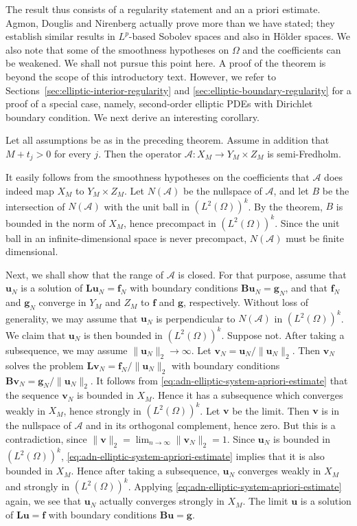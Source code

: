 The result thus consists of a regularity statement and an a priori estimate. Agmon, Douglis and Nirenberg actually prove more than we have stated; they establish similar results in $L^p$-based Sobolev spaces and also in Hölder spaces. We also note that some of the smoothness hypotheses on $\Omega$ and the coefficients can be weakened. We shall not pursue this point here. A proof of the theorem is beyond the scope of this introductory text. However, we refer to Sections~\ref{sec:elliptic-interior-regularity} and \ref{sec:elliptic-boundary-regularity} for a proof of a special case, namely, second-order elliptic PDEs with Dirichlet boundary condition. We next derive an interesting corollary.

\begin{Corollary}
\label{cor:adn-boundary-operator-semi-fredholm}
Let all assumptions be as in the preceding theorem. Assume in addition that $M+t_j>0$ for every $j$. Then the operator $\mathcal{A}:X_M\to Y_M\times Z_M$ is semi-Fredholm.
\end{Corollary}

\begin{Proof}
It easily follows from the smoothness hypotheses on the coefficients that $\mathcal{A}$ does indeed map $X_M$ to $Y_M\times Z_M$. Let $N(\mathcal{A})$ be the nullspace of $\mathcal{A}$, and let $B$ be the intersection of $N(\mathcal{A})$ with the unit ball in $(L^2(\Omega))^k$. By the theorem, $B$ is bounded in the norm of $X_M$, hence precompact in $(L^2(\Omega))^k$. Since the unit ball in an infinite-dimensional space is never precompact, $N(\mathcal{A})$ must be finite dimensional.

Next, we shall show that the range of $\mathcal{A}$ is closed. For that purpose, assume that $\bm{u}_N$ is a solution of $\bm{L}\bm{u}_N=\bm{f}_N$ with boundary conditions $\bm{B}\bm{u}_N=\bm{g}_N$, and that $\bm{f}_N$ and $\bm{g}_N$ converge in $Y_M$ and $Z_M$ to $\bm{f}$ and $\bm{g}$, respectively. Without loss of generality, we may assume that $\bm{u}_N$ is perpendicular to $N(\mathcal{A})$ in $(L^2(\Omega))^k$. We claim that $\bm{u}_N$ is then bounded in $(L^2(\Omega))^k$. Suppose not. After taking a subsequence, we may assume $\|\bm{u}_N\|_2\to\infty$. Let $\bm{v}_N=\bm{u}_N/\|\bm{u}_N\|_2$. Then $\bm{v}_N$ solves the problem $\bm{L}\bm{v}_N=\bm{f}_N/\|\bm{u}_N\|_2$ with boundary conditions $\bm{B}\bm{v}_N=\bm{g}_N/\|\bm{u}_N\|_2$. It follows from \eqref{eq:adn-elliptic-system-apriori-estimate} that the sequence $\bm{v}_N$ is bounded in $X_M$. Hence it has a subsequence which converges weakly in $X_M$, hence strongly in $(L^2(\Omega))^k$. Let $\bm{v}$ be the limit. Then $\bm{v}$ is in the nullspace of $\mathcal{A}$ and in its orthogonal complement, hence zero. But this is a contradiction, since $\|\bm{v}\|_2=\lim_{n\to\infty}\|\bm{v}_N\|_2=1$. Since $\bm{u}_N$ is bounded in $(L^2(\Omega))^k$, \eqref{eq:adn-elliptic-system-apriori-estimate} implies that it is also bounded in $X_M$. Hence after taking a subsequence, $\bm{u}_N$ converges weakly in $X_M$ and strongly in $(L^2(\Omega))^k$. Applying \eqref{eq:adn-elliptic-system-apriori-estimate} again, we see that $\bm{u}_N$ actually converges strongly in $X_M$. The limit $\bm{u}$ is a solution of $\bm{L}\bm{u}=\bm{f}$ with boundary conditions $\bm{B}\bm{u}=\bm{g}$.
\end{Proof}
